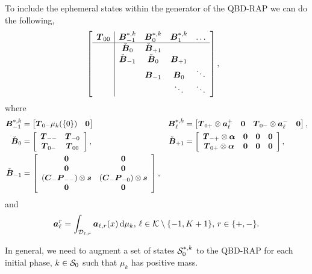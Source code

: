 To include the ephemeral states within the generator of the QBD-RAP we can do the following, 
\begin{align*}
	&\left[\begin{array}{c|cccc}
		\boldsymbol T_{00} & \boldsymbol B_{-1}^{*,k} &\boldsymbol B_{0}^{*,k}&\boldsymbol B_{1}^{*,k} & \hdots \\\hline
		&\check{\boldsymbol B}_{0} &  \check{\boldsymbol B}_{+1} &&\\
		& \check{\boldsymbol B}_{-1}&\check{\boldsymbol B}_{0}&\boldsymbol B_{+1}& \\
		&&\boldsymbol B_{-1} & \boldsymbol B_0&\ddots \\
		&&&\ddots&\ddots 
	\end{array}\right],
\end{align*}
where 
\begin{align*}
	\boldsymbol B_{-1}^{*,k} &= \begin{bmatrix} \boldsymbol T_{0-}\mu_k(\{0\}) & \boldsymbol 0 \end{bmatrix} & \boldsymbol B_{\ell}^{*,k} &= \begin{bmatrix} \boldsymbol T_{0+}\otimes \boldsymbol a_\ell^+ & \boldsymbol 0 & \boldsymbol T_{0-}\otimes \boldsymbol a_\ell^- & \boldsymbol 0 \end{bmatrix},
	\\\check{\boldsymbol B}_{0} &= \left[\begin{array}{cc}\boldsymbol T_{--} & \boldsymbol T_{-0}\\\boldsymbol T_{0-} & \boldsymbol T_{00}\end{array}\right], 
	& \check{\boldsymbol B}_{+1} &= \left[\begin{array}{cccc}\boldsymbol T_{-+}\otimes \boldsymbol \alpha & \boldsymbol 0 & \boldsymbol 0 & \boldsymbol 0 \\ \boldsymbol T_{0+}\otimes \boldsymbol \alpha & \boldsymbol 0 & \boldsymbol 0 & \boldsymbol 0 \end{array}\right],
	\\\check{\boldsymbol B}_{-1} &= \left[\begin{array}{cc} \boldsymbol0&\boldsymbol0\\\boldsymbol0&\boldsymbol0\\(\boldsymbol C_-\boldsymbol P_{--})\otimes \boldsymbol s & (\boldsymbol C_-\boldsymbol P_{-0})\otimes \boldsymbol s \\\boldsymbol0&\boldsymbol0\end{array}\right], &&
\end{align*}
and 
\begin{align*}
	\boldsymbol a_\ell^r = \int_{\mathcal{D}_{\ell,r}} \boldsymbol a_{\ell,r}(x)\, \mathrm{d} \mu_k,\, \ell\in\mathcal K\setminus\{-1,K+1\},\, r\in\{+,-\}. 
\end{align*}

In general, we need to augment a set of states \(\mathcal{S}_0^{*,k}\) to the QBD-RAP for each initial phase, \(k\in\mathcal{S}_0\) such that \(\mu_k\) has positive mass. 

